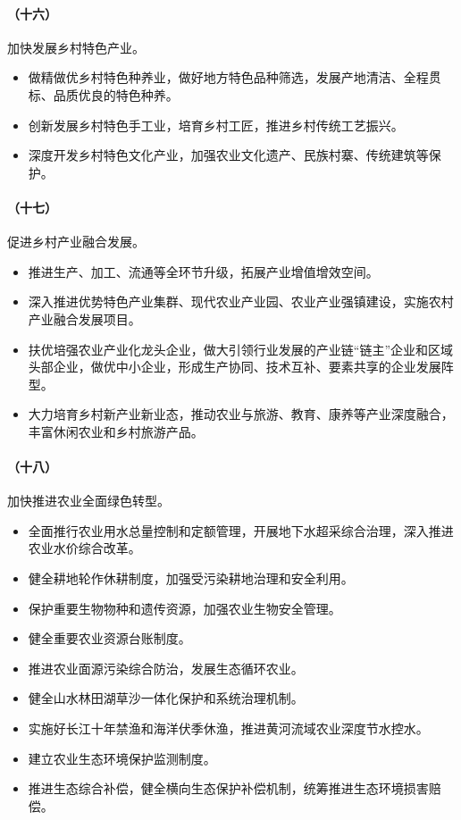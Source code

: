 \paragraph{（十六）}加快发展乡村特色产业。

\begin{itemize}
    \item 做精做优乡村特色种养业，做好地方特色品种筛选，发展产地清洁、全程贯标、品质优良的特色种养。
    \item 创新发展乡村特色手工业，培育乡村工匠，推进乡村传统工艺振兴。
    \item 深度开发乡村特色文化产业，加强农业文化遗产、民族村寨、传统建筑等保护。
\end{itemize}

\paragraph{（十七）}促进乡村产业融合发展。

\begin{itemize}
    \item 推进生产、加工、流通等全环节升级，拓展产业增值增效空间。
    \item 深入推进优势特色产业集群、现代农业产业园、农业产业强镇建设，实施农村产业融合发展项目。
    \item 扶优培强农业产业化龙头企业，做大引领行业发展的产业链“链主”企业和区域头部企业，做优中小企业，形成生产协同、技术互补、要素共享的企业发展阵型。
    \item 大力培育乡村新产业新业态，推动农业与旅游、教育、康养等产业深度融合，丰富休闲农业和乡村旅游产品。
\end{itemize}

\paragraph{（十八）}加快推进农业全面绿色转型。

\begin{itemize}
    \item 全面推行农业用水总量控制和定额管理，开展地下水超采综合治理，深入推进农业水价综合改革。
    \item 健全耕地轮作休耕制度，加强受污染耕地治理和安全利用。
    \item 保护重要生物物种和遗传资源，加强农业生物安全管理。
    \item 健全重要农业资源台账制度。
    \item 推进农业面源污染综合防治，发展生态循环农业。
    \item 健全山水林田湖草沙一体化保护和系统治理机制。
    \item 实施好长江十年禁渔和海洋伏季休渔，推进黄河流域农业深度节水控水。
    \item 建立农业生态环境保护监测制度。
    \item 推进生态综合补偿，健全横向生态保护补偿机制，统筹推进生态环境损害赔偿。
\end{itemize}

